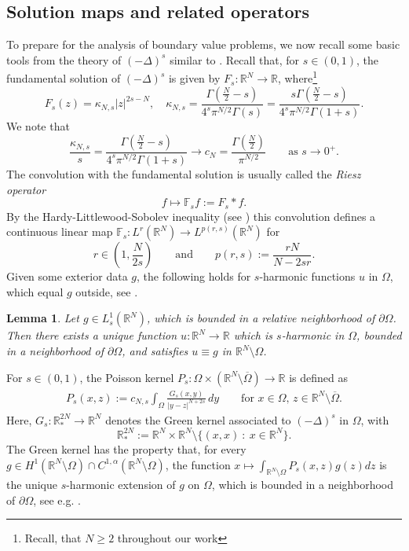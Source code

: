 \documentclass[notitlepage,11pt,reqno]{amsart}
\newtheorem{lemma}[theorem]{Lemma}
\theoremstyle{definition}
\numberwithin{equation}{section}
\newcommand{\cFs}{{\mathbb F}}
\newcommand{\RR}{\mathds{R}}
\begin{document}
\subsection{Solution maps and related operators}\label{sec.defis ops}
To prepare for the analysis of boundary value problems, we now recall some basic tools from the theory of $(-\Delta)^s$ similar to \cite{JSW20}. Recall that, for $s \in (0,1)$, the fundamental solution of $(-\Delta)^s$ is given by $F_s:\RR^N\to\RR$, where\footnote{Recall, that $N\geq 2$ throughout our work}
\[
F_s(z)=\kappa_{N,s}|z|^{2s-N},\quad\kappa_{N,s}=\frac{\Gamma(\frac{N}{2}-s)}{4^s\pi^{N/2}\Gamma(s)}=\frac{s \Gamma(\frac{N}{2}-s)}{4^s\pi^{N/2}\Gamma(1+s)}.
\]
We note that 
\begin{equation}
  \label{eq:kappa-N-s-limit}
\frac{\kappa_{N,s}}{s} = \frac{\Gamma(\frac{N}{2}-s)}{4^s\pi^{N/2}\Gamma(1+s)}
\to c_N= \frac{\Gamma(\frac{N}{2})}{\pi^{N/2}}\qquad \text{as $s \to 0^+$.}
\end{equation}
The convolution with the fundamental solution is usually called the {\em Riesz operator} 
$$
f \mapsto \cFs_s f:= F_s * f.
$$
By the Hardy-Littlewood-Sobolev inequality (see \cite{LL01,L83}) this convolution defines a continuous linear map $\cFs_s: L^r(\RR^N) \to L^{p(r,s)}(\RR^N)$ for 
\begin{equation}\label{prs}
r \in (1,\frac{N}{2s}) \qquad \text{and}\qquad p(r,s):= \frac{rN}{N-2sr}.
\end{equation}
Given some exterior data $g$, the following holds for $s$-harmonic functions $u$ in $\Omega$, which equal $g$ outside, see \cite{nicola,BB99,BJK19}.
\begin{lemma}
\label{poisson-representation-new-zero}
Let $g\in L^1_s(\RR^N)$, which is bounded in a relative neighborhood of $\partial \Omega$. Then there exists a unique function $u: \RR^N \to \RR$ which is $s$-harmonic in $\Omega$, bounded in a neighborhood of $\partial \Omega$, and satisfies $u \equiv g$ in $\RR^N \setminus \Omega$.  
\end{lemma}
For $s \in (0,1)$, the Poisson kernel $P_s: \Omega \times (\RR^N\setminus \overline{\Omega}) \to \RR$ is defined as
\begin{align}\label{Psdef}
P_s(x,z):=c_{N,s}\int_\Omega \frac{G_s(x,y)}{|y-z|^{N+2s}}\, dy\qquad \text{for $x\in \Omega$, $z\in \RR^N\setminus\overline{\Omega}$.}
\end{align}
Here, $G_s: \RR^{2N}_* \to \RR^N$ denotes the Green kernel associated to $(-\Delta)^s$ in $\Omega$, with
$$
\RR^{2N}_* := \RR^N \times \RR^N \setminus \{(x,x)\:: \: x \in \RR^N\}.
$$
The Green kernel has the property that, for every $g\in H^1(\RR^N\setminus\Omega)\cap C^{1,\alpha}(\RR^N\setminus\Omega)$, the function $x \mapsto \int_{\RR^N\setminus\Omega}P_s(x,z)g(z)dz$
is the unique $s$-harmonic extension of $g$ on $\Omega$, which is bounded in a neighborhood of $\partial \Omega$, see e.g. \cite{BKK08}.\\
\end{document}
